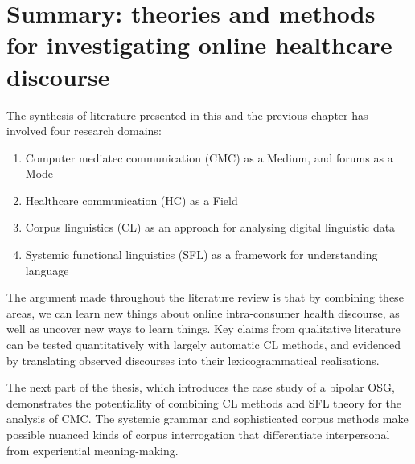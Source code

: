 



%

\section[Chapter summary]{Summary: theories and methods for investigating online healthcare discourse}

The synthesis of literature presented in this and the previous chapter has involved four research domains:

\begin{enumerate}
	\item Computer mediatec communication (CMC) as a Medium, and \glspl{forum} as a \gls{Mode}
	\item Healthcare communication (HC) as a Field
	\item Corpus linguistics (CL) as an approach for analysing digital linguistic data
	\item Systemic functional linguistics (SFL) as a framework for understanding language
\end{enumerate}
%
The argument made throughout the literature review is that by combining these areas, we can learn new things about online intra\hyp{}\gls{consumer} health discourse, as well as uncover new ways to learn things. Key claims from qualitative literature can be tested quantitatively with largely automatic \gls{CL} methods, and evidenced by translating observed discourses into their lexicogrammatical realisations. 

The next part of the thesis, which introduces the case study of a \gls{bipolar} \gls{OSG}, demonstrates the potentiality of combining \gls{CL} methods and \gls{SFL} theory for the analysis of \gls{CMC}. The systemic grammar and sophisticated corpus methods make possible nuanced kinds of corpus interrogation that differentiate interpersonal from experiential meaning\hyp{}making.





%
